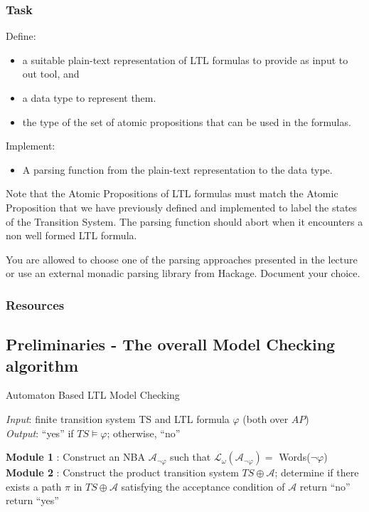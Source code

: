 \documentclass{article}
\begin{document}
\subsubsection*{Task}
Define:
\begin{itemize}
    \item a suitable plain-text representation of LTL formulas to provide as input to out tool, and
    \item a data type to represent them. 
    \item the type of the set of atomic propositions that can be used in the formulas.
\end{itemize}
Implement: 
\begin{itemize}
    \item A parsing function from the plain-text representation to the data type.
\end{itemize}
Note that the Atomic Propositions of LTL formulas must match the Atomic Proposition that we have previously 
defined and implemented to label the states of the Transition System. The parsing function should abort 
when it encounters a non well formed LTL formula.

You are allowed to choose one of the parsing approaches presented in the lecture or 
use an external monadic parsing library from Hackage. Document your choice.

\subsubsection*{Resources}
\cite[Paragraph 5.1(in particular 5.1.1 and 5.1.2)]{BaKa}

\subsection{Preliminaries - The overall Model Checking algorithm}
\begin{algorithm}[H]
    \caption{Automaton Based LTL Model Checking}
    \label{alg:mc}
    \hspace*{\algorithmicindent} \emph{Input}: finite transition system TS and LTL formula $\varphi$ (both over $AP$) \\
    \hspace*{\algorithmicindent} \emph{Output}: ``yes'' if $TS \vDash \varphi$; otherwise, ``no''
    \begin{algorithmic}[1]
    \State \textbf{Module 1} : Construct an NBA $\mathcal{A}_{\neg \varphi}$ such that $\mathcal{L}_{\omega}(\mathcal{A}_{\neg \varphi}) = $ Words($\neg \varphi$) 
    \State \textbf{Module 2} : Construct the product transition system $TS \oplus \mathcal{A}$; determine if there exists 
                a path $\pi$ in $TS \oplus \mathcal{A}$ satisfying the acceptance condition of $\mathcal{A}$
    \State
        \State return ``no'' 
    \Else 
        \State return ``yes''
    \EndIf
    \end{algorithmic}
\end{algorithm}
  
\end{document}
